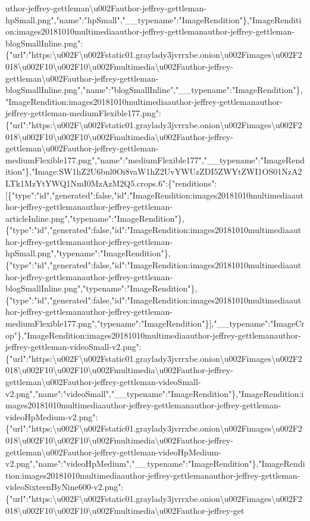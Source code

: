 uthor-jeffrey-gettleman\textbackslash{}u002Fauthor-jeffrey-gettleman-hpSmall.png","name":"hpSmall","\_\_typename":"ImageRendition"\},"ImageRendition:images20181010multimediaauthor-jeffrey-gettlemanauthor-jeffrey-gettleman-blogSmallInline.png":\{"url":"https:\textbackslash{}u002F\textbackslash{}u002Fstatic01.graylady3jvrrxbe.onion\textbackslash{}u002Fimages\textbackslash{}u002F2018\textbackslash{}u002F10\textbackslash{}u002F10\textbackslash{}u002Fmultimedia\textbackslash{}u002Fauthor-jeffrey-gettleman\textbackslash{}u002Fauthor-jeffrey-gettleman-blogSmallInline.png","name":"blogSmallInline","\_\_typename":"ImageRendition"\},"ImageRendition:images20181010multimediaauthor-jeffrey-gettlemanauthor-jeffrey-gettleman-mediumFlexible177.png":\{"url":"https:\textbackslash{}u002F\textbackslash{}u002Fstatic01.graylady3jvrrxbe.onion\textbackslash{}u002Fimages\textbackslash{}u002F2018\textbackslash{}u002F10\textbackslash{}u002F10\textbackslash{}u002Fmultimedia\textbackslash{}u002Fauthor-jeffrey-gettleman\textbackslash{}u002Fauthor-jeffrey-gettleman-mediumFlexible177.png","name":"mediumFlexible177","\_\_typename":"ImageRendition"\},"Image:SW1hZ2U6bnl0Oi8vaW1hZ2UvYWUzZDI5ZWYtZWI1OS01NzA2LTk1MzYtYWQ1NmI0MzAzM2Q5.crops.6":\{"renditions":{[}\{"type":"id","generated":false,"id":"ImageRendition:images20181010multimediaauthor-jeffrey-gettlemanauthor-jeffrey-gettleman-articleInline.png","typename":"ImageRendition"\},\{"type":"id","generated":false,"id":"ImageRendition:images20181010multimediaauthor-jeffrey-gettlemanauthor-jeffrey-gettleman-hpSmall.png","typename":"ImageRendition"\},\{"type":"id","generated":false,"id":"ImageRendition:images20181010multimediaauthor-jeffrey-gettlemanauthor-jeffrey-gettleman-blogSmallInline.png","typename":"ImageRendition"\},\{"type":"id","generated":false,"id":"ImageRendition:images20181010multimediaauthor-jeffrey-gettlemanauthor-jeffrey-gettleman-mediumFlexible177.png","typename":"ImageRendition"\}{]},"\_\_typename":"ImageCrop"\},"ImageRendition:images20181010multimediaauthor-jeffrey-gettlemanauthor-jeffrey-gettleman-videoSmall-v2.png":\{"url":"https:\textbackslash{}u002F\textbackslash{}u002Fstatic01.graylady3jvrrxbe.onion\textbackslash{}u002Fimages\textbackslash{}u002F2018\textbackslash{}u002F10\textbackslash{}u002F10\textbackslash{}u002Fmultimedia\textbackslash{}u002Fauthor-jeffrey-gettleman\textbackslash{}u002Fauthor-jeffrey-gettleman-videoSmall-v2.png","name":"videoSmall","\_\_typename":"ImageRendition"\},"ImageRendition:images20181010multimediaauthor-jeffrey-gettlemanauthor-jeffrey-gettleman-videoHpMedium-v2.png":\{"url":"https:\textbackslash{}u002F\textbackslash{}u002Fstatic01.graylady3jvrrxbe.onion\textbackslash{}u002Fimages\textbackslash{}u002F2018\textbackslash{}u002F10\textbackslash{}u002F10\textbackslash{}u002Fmultimedia\textbackslash{}u002Fauthor-jeffrey-gettleman\textbackslash{}u002Fauthor-jeffrey-gettleman-videoHpMedium-v2.png","name":"videoHpMedium","\_\_typename":"ImageRendition"\},"ImageRendition:images20181010multimediaauthor-jeffrey-gettlemanauthor-jeffrey-gettleman-videoSixteenByNine600-v2.png":\{"url":"https:\textbackslash{}u002F\textbackslash{}u002Fstatic01.graylady3jvrrxbe.onion\textbackslash{}u002Fimages\textbackslash{}u002F2018\textbackslash{}u002F10\textbackslash{}u002F10\textbackslash{}u002Fmultimedia\textbackslash{}u002Fauthor-jeffrey-get